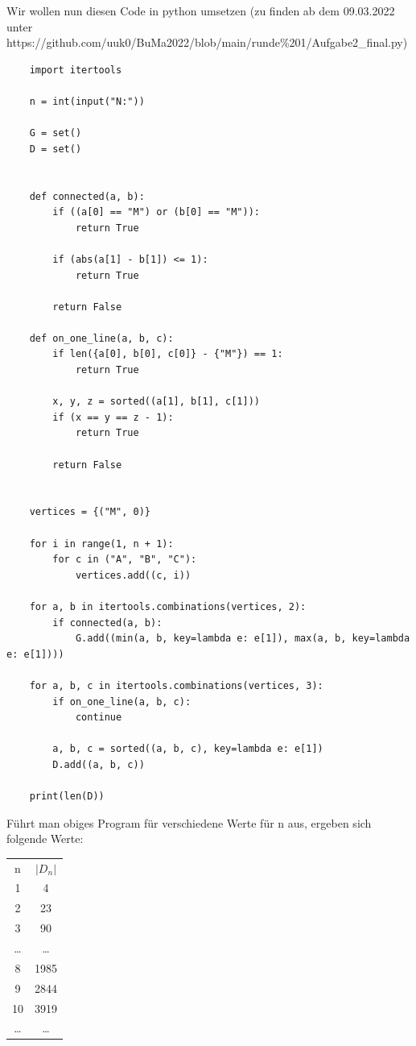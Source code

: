 \documentclass[11pt]{article}
\begin{document}
    \newpage

    Wir wollen nun diesen Code in python umsetzen (zu finden ab dem 09.03.2022 unter https://github.com/uuk0/BuMa2022/blob/main/runde\%201/Aufgabe2\_final.py)

    \lstset{language=Python}
    \lstset{frame=lines}
    \lstset{basicstyle=\footnotesize}
    \begin{lstlisting}
    import itertools

    n = int(input("N:"))

    G = set()
    D = set()


    def connected(a, b):
        if ((a[0] == "M") or (b[0] == "M")):
            return True

        if (abs(a[1] - b[1]) <= 1):
            return True

        return False

    def on_one_line(a, b, c):
        if len({a[0], b[0], c[0]} - {"M"}) == 1:
            return True

        x, y, z = sorted((a[1], b[1], c[1]))
        if (x == y == z - 1):
            return True

        return False


    vertices = {("M", 0)}

    for i in range(1, n + 1):
        for c in ("A", "B", "C"):
            vertices.add((c, i))

    for a, b in itertools.combinations(vertices, 2):
        if connected(a, b):
            G.add((min(a, b, key=lambda e: e[1]), max(a, b, key=lambda e: e[1])))

    for a, b, c in itertools.combinations(vertices, 3):
        if on_one_line(a, b, c):
            continue

        a, b, c = sorted((a, b, c), key=lambda e: e[1])
        D.add((a, b, c))

    print(len(D))
    \end{lstlisting}

    \newpage

    Führt man obiges Program für verschiedene Werte für n aus, ergeben sich folgende Werte:

    \begin{tabular}{c c}
        n & $|D_n|$ \\
        1 & 4 \\
        2 & 23 \\
        3 & 90 \\
        \ldots & \ldots \\
        8 & 1985 \\
        9 & 2844 \\
        10 & 3919 \\
        \ldots & \ldots \\
    \end{tabular}
\end{document}
